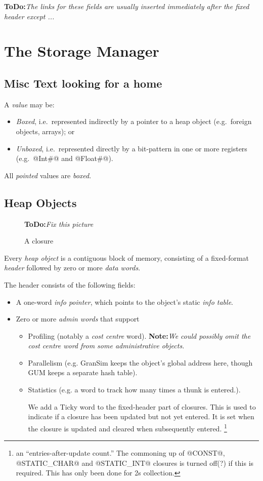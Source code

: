 \documentclass[11pt]{article}
\newcommand{\note}[1]{{{\bf Note:}\sl #1}}
\newcommand{\ToDo}[1]{{{\bf ToDo:}\sl #1}}
\newcommand{\Section}[2]{\section{#1}\label{sec:#2}}
\newcommand{\Subsection}[2]{\subsection{#1}\label{sec:#2}}
\begin{document}
\ToDo{The links for these fields are usually inserted immediately
after the fixed header except ...}



\Section{The Storage Manager}{storage-manager-internals}

\subsection{Misc Text looking for a home}

A \emph{value} may be:
\begin{itemize}
\item \emph{Boxed}, i.e.~represented indirectly by a pointer to a heap object (e.g.~foreign objects, arrays); or
\item \emph{Unboxed}, i.e.~represented directly by a bit-pattern in one or more registers (e.g.~@Int#@ and @Float#@).
\end{itemize}
All \emph{pointed} values are \emph{boxed}.  


\Subsection{Heap Objects}{heap-objects}
\label{sec:fixed-header}

\begin{figure}
\begin{center}

\end{center}
\ToDo{Fix this picture}
\caption{A closure}
\label{fig:closure}
\end{figure}

Every \emph{heap object} is a contiguous block of memory, consisting
of a fixed-format \emph{header} followed by zero or more \emph{data
words}.

The header consists of the following fields:
\begin{itemize}
\item A one-word \emph{info pointer}, which points to
the object's static \emph{info table}.
\item Zero or more \emph{admin words} that support
\begin{itemize}
\item Profiling (notably a \emph{cost centre} word).
  \note{We could possibly omit the cost centre word from some 
  administrative objects.}
\item Parallelism (e.g. GranSim keeps the object's global address here,
though GUM keeps a separate hash table).
\item Statistics (e.g. a word to track how many times a thunk is entered.).

We add a Ticky word to the fixed-header part of closures.  This is
used to indicate if a closure has been updated but not yet entered. It
is set when the closure is updated and cleared when subsequently
entered.  \footnote{%
an ``entries-after-update count.''  The commoning up of @CONST@,
@STATIC_CHAR@ and @STATIC_INT@ closures is turned off(?) if this is
required. This has only been done for 2s collection.  }

\end{itemize}
\end{itemize}
\end{document}
